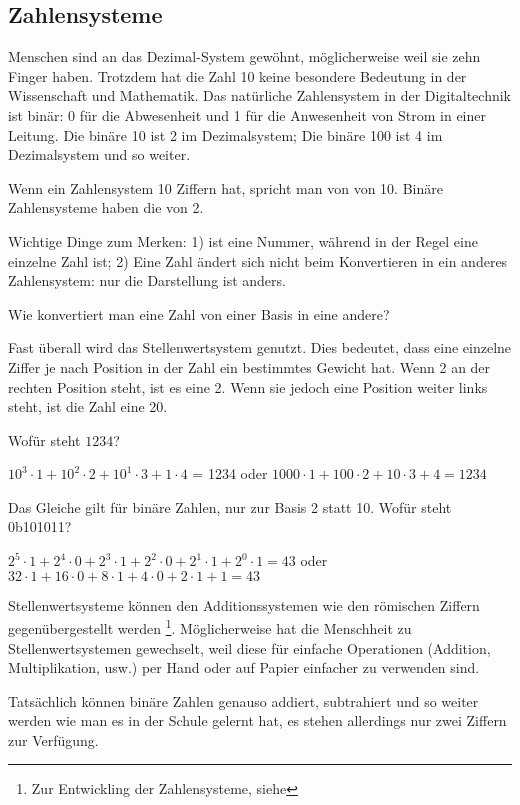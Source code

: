 \subsection{Zahlensysteme}

Menschen sind an das Dezimal-System gewöhnt, möglicherweise weil sie zehn Finger haben.
Trotzdem hat die Zahl 10 keine besondere Bedeutung in der Wissenschaft und Mathematik.
Das natürliche Zahlensystem in der Digitaltechnik ist binär: 0 für die Abwesenheit und 1 für die Anwesenheit von
Strom in einer Leitung. Die binäre 10 ist 2 im Dezimalsystem; Die binäre 100 ist 4 im Dezimalsystem und so weiter.

Wenn ein Zahlensystem 10 Ziffern hat, spricht man von  von 10.
Binäre Zahlensysteme haben die  von 2.

Wichtige Dinge zum Merken:
1)  ist eine Nummer, während  in der Regel eine einzelne Zahl ist;
2) Eine Zahl ändert sich nicht beim Konvertieren in ein anderes Zahlensystem: nur die Darstellung ist anders.

Wie konvertiert man eine Zahl von einer Basis in eine andere?

Fast überall wird das Stellenwertsystem genutzt. Dies bedeutet, dass eine einzelne Ziffer je nach Position in der Zahl ein bestimmtes Gewicht hat.
Wenn 2 an der rechten Position steht, ist es eine 2.
Wenn sie jedoch eine Position weiter links steht, ist die Zahl eine 20.

Wofür steht $1234$?

$10^3 \cdot 1 + 10^2 \cdot 2 + 10^1 \cdot 3 + 1 \cdot 4$ = 1234 oder 
$1000 \cdot 1 + 100 \cdot 2 + 10 \cdot 3 + 4 = 1234$

Das Gleiche gilt für binäre Zahlen, nur zur Basis 2 statt 10.
Wofür steht 0b101011?

$2^5 \cdot 1 + 2^4 \cdot 0 + 2^3 \cdot 1 + 2^2 \cdot 0 + 2^1 \cdot 1 + 2^0 \cdot 1 = 43$ oder
$32 \cdot 1 + 16 \cdot 0 + 8 \cdot 1 + 4 \cdot 0 + 2 \cdot 1 + 1 = 43$

Stellenwertsysteme können den Additionssystemen wie den römischen Ziffern gegenübergestellt werden
\footnote{Zur Entwickling der Zahlensysteme, siehe }.
Möglicherweise hat die Menschheit zu Stellenwertsystemen gewechselt, weil diese für einfache Operationen (Addition, Multiplikation, usw.)
per Hand oder auf Papier einfacher zu verwenden sind.

Tatsächlich können binäre Zahlen genauso addiert, subtrahiert und so weiter werden wie man es in der Schule gelernt hat,
es stehen allerdings nur zwei Ziffern zur Verfügung.

